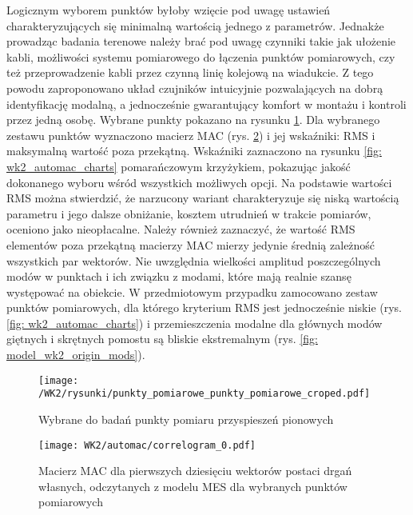 Logicznym wyborem punktów byłoby wzięcie pod uwagę ustawień charakteryzujących się minimalną wartością jednego z parametrów. Jednakże prowadząc badania terenowe należy brać pod uwagę czynniki takie jak ułożenie kabli, możliwości systemu pomiarowego do łączenia punktów pomiarowych, czy też przeprowadzenie kabli przez czynną linię kolejową na wiadukcie. Z tego powodu zaproponowano układ czujników intuicyjnie pozwalających na dobrą identyfikację modalną, a jednocześnie gwarantujący komfort w montażu i kontroli przez jedną osobę. Wybrane punkty pokazano na rysunku \ref{fig: wk2_automac_points_choosen}. Dla wybranego zestawu punktów wyznaczono macierz MAC (rys. \ref{fig: wk2_automac_correlogram}) i jej wskaźniki: RMS i maksymalną wartość poza przekątną. Wskaźniki zaznaczono na rysunku \ref{fig: wk2_automac_charts} pomarańczowym krzyżykiem, pokazując jakość dokonanego wyboru wśród wszystkich możliwych opcji. Na podstawie wartości RMS można stwierdzić, że narzucony wariant charakteryzuje się niską wartością parametru i jego dalsze obniżanie, kosztem utrudnień w trakcie pomiarów, oceniono jako nieopłacalne. Należy również zaznaczyć, że wartość RMS elementów poza przekątną macierzy MAC mierzy jedynie średnią zależność wszystkich par wektorów. Nie uwzględnia wielkości amplitud poszczególnych modów w punktach i ich związku z modami, które mają realnie szansę występować na obiekcie. W przedmiotowym przypadku zamocowano zestaw punktów pomiarowych, dla którego kryterium RMS jest jednocześnie niskie (rys. \ref{fig: wk2_automac_charts}) i przemieszczenia modalne dla głównych modów giętnych i skrętnych pomostu są bliskie ekstremalnym (rys. \ref{fig: model_wk2_origin_mods}).


\begin{figure}[hbt!]
	\centering
	\texttt{[image: /WK2/rysunki/punkty\_pomiarowe\_punkty\_pomiarowe\_croped.pdf]}
	\captionsetup{justification=centering}
	\caption{Wybrane do badań punkty pomiaru przyspieszeń pionowych}
	\label{fig: wk2_automac_points_choosen}
\end{figure}


\begin{figure}[hbt!]
	\centering
	\texttt{[image: WK2/automac/correlogram\_0.pdf]}
	\captionsetup{justification=centering}
	\caption{Macierz MAC dla pierwszych dziesięciu wektorów postaci drgań własnych, odczytanych z modelu MES dla wybranych punktów pomiarowych}
	\label{fig: wk2_automac_correlogram}
\end{figure}


